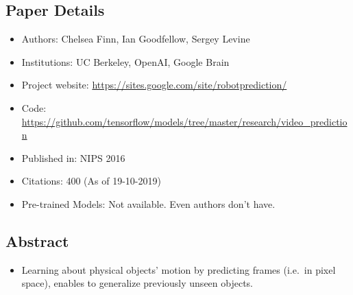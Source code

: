 \documentclass{article}
\begin{document}
    \subsection*{Paper Details}
    \begin{itemize}
        \item Authors: Chelsea Finn, Ian Goodfellow, Sergey Levine
        \item Institutions: UC Berkeley, OpenAI, Google Brain
        \item Project website: \url{https://sites.google.com/site/robotprediction/}
        \item Code: \url{https://github.com/tensorflow/models/tree/master/research/video_prediction}
        \item Published in: NIPS 2016
        \item Citations: 400 (As of 19-10-2019)
        \item Pre-trained Models: Not available.
        Even authors don't have.
    \end{itemize}

    \subsection*{Abstract}
    \begin{itemize}
        \item Learning about physical objects' motion by predicting frames (i.e.\ in pixel space), enables to generalize previously unseen objects.
    \end{itemize}
\end{document}
